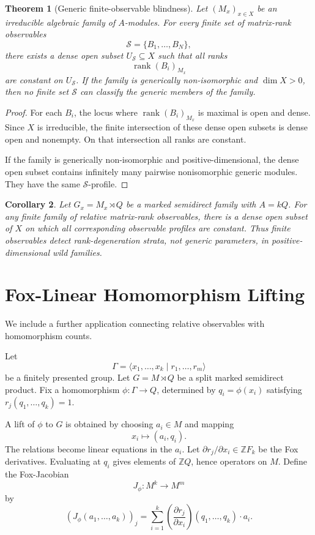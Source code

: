 \documentclass[11pt]{article}
\newtheorem{theorem}{Theorem}[section]
\newtheorem{corollary}[theorem]{Corollary}
\begin{document}
\begin{theorem}[Generic finite-observable blindness]
Let $(M_x)_{x\in X}$ be an irreducible algebraic family of $A$-modules. For every finite set of matrix-rank observables
\[
\mathcal S=\{B_1,\ldots,B_N\},
\]
there exists a dense open subset $U_{\mathcal S}\subseteq X$ such that all ranks
\[
\operatorname{rank}(B_i)_{M_x}
\]
are constant on $U_{\mathcal S}$. If the family is generically non-isomorphic and $\dim X>0$, then no finite set $\mathcal S$ can classify the generic members of the family.
\end{theorem}

\begin{proof}
For each $B_i$, the locus where $\operatorname{rank}(B_i)_{M_x}$ is maximal is open and dense. Since $X$ is irreducible, the finite intersection of these dense open subsets is dense open and nonempty. On that intersection all ranks are constant.

If the family is generically non-isomorphic and positive-dimensional, the dense open subset contains infinitely many pairwise nonisomorphic generic modules. They have the same $\mathcal S$-profile.
\end{proof}

\begin{corollary}
Let $G_x=M_x\rtimes Q$ be a marked semidirect family with $A=kQ$. For any finite family of relative matrix-rank observables, there is a dense open subset of $X$ on which all corresponding observable profiles are constant. Thus finite observables detect rank-degeneration strata, not generic parameters, in positive-dimensional wild families.
\end{corollary}

\section{Fox-Linear Homomorphism Lifting}

We include a further application connecting relative observables with homomorphism counts.

Let
\[
\Gamma=\langle x_1,\ldots,x_k\mid r_1,\ldots,r_m\rangle
\]
be a finitely presented group. Let $G=M\rtimes Q$ be a split marked semidirect product. Fix a homomorphism $\phi:\Gamma\to Q$, determined by $q_i=\phi(x_i)$ satisfying $r_j(q_1,\ldots,q_k)=1$.

A lift of $\phi$ to $G$ is obtained by choosing $a_i\in M$ and mapping
\[
x_i\mapsto (a_i,q_i).
\]
The relations become linear equations in the $a_i$. Let $\partial r_j/\partial x_i\in\mathbb ZF_k$ be the Fox derivatives. Evaluating at $q_i$ gives elements of $\mathbb ZQ$, hence operators on $M$. Define the Fox-Jacobian
\[
J_\phi:M^k\to M^m
\]
by
\[
(J_\phi(a_1,\ldots,a_k))_j
=
\sum_{i=1}^k
\left(\frac{\partial r_j}{\partial x_i}\right)(q_1,\ldots,q_k)\cdot a_i.
\]
\end{document}
